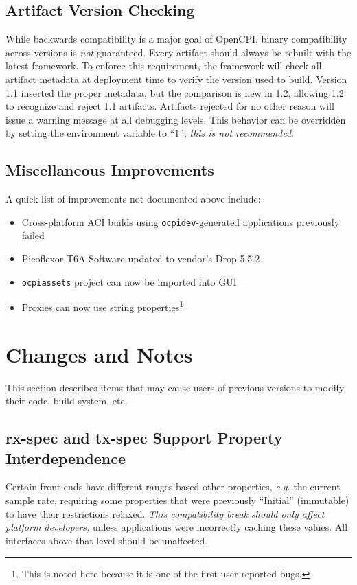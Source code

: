 \subsection{Artifact Version Checking} %
While backwards compatibility is a major goal of OpenCPI, binary compatibility across versions is \textit{not} guaranteed. Every artifact should always be rebuilt with the latest framework. To enforce this requirement, the framework will check all artifact metadata at deployment time to verify the version used to build. Version 1.1 inserted the proper metadata, but the comparison is new in 1.2, allowing 1.2 to recognize and reject 1.1 artifacts. Artifacts rejected for no other reason will issue a warning message at all debugging levels. This behavior can be overridden by setting the environment variable  to ``1''; \textit{this is not recommended}.

\subsection{Miscellaneous Improvements}
A quick list of improvements not documented above include:
\begin{itemize}
\setlength\itemsep{0em} %
\item Cross-platform ACI builds using \texttt{ocpidev}-generated applications previously failed %
\item Picoflexor T6A Software updated to vendor's Drop 5.5.2 %
\item \texttt{ocpiassets} project can now be imported into GUI %
\item Proxies can now use string properties\footnote{This is noted here because it is one of the first user reported bugs.} %
\end{itemize}

\section{Changes and Notes}
This section describes items that may cause users of previous versions to modify their code, build system, etc.

\subsection{rx-spec and tx-spec Support Property Interdependence} %
Certain front-ends have different ranges based other properties, \textit{e.g.} the current sample rate, requiring some properties that were previously ``Initial'' (immutable) to have their restrictions relaxed. \textit{This compatibility break should only affect platform developers,} unless applications were incorrectly caching these values. All interfaces above that level should be unaffected.

